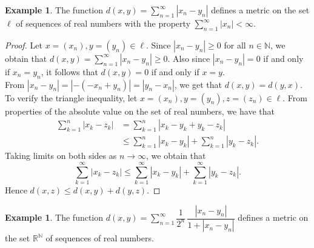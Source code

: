 \documentclass[11pt,a4paper]{article}
\theoremstyle{definition}
\newtheorem{exa}[thm]{Example}
\begin{document}
\begin{exa}
The function $d(x,y)=\sum_{n=1}^{\infty} |x_n-y_n|$ defines a metric on the set $\ell$ of sequences of real numbers with the property $\sum^{\infty}_{n=1} |x_n| <\infty$.
\end{exa}



\begin{proof}
Let $x=(x_n),y=(y_n)\in \ell$. Since $|x_n-y_n|\geq 0$ for all $n\in \mathbb{N}$, we obtain that $d(x,y)=\sum\limits^{\infty}_{n=1} |x_n-y_n|\geq 0$. Also since $|x_n-y_n|=0$ if and only if $x_n=y_n$, it follows that $d(x,y)=0$ if and only if $x=y$.\\ 
From $|x_n-y_n|=|-(-x_n+y_n)|=|y_n-x_n|$, we get that $d(x,y)=d(y,x).$\\ 
To verify the triangle inequality, let $x=(x_n), y=(y_n), z=(z_n)\in \ell$. From properties of the absolute value on the set of real numbers, we have that
\begin{align*}
\sum^n_{k=1} |x_k-z_k| &=\sum_{k=1}^n |x_k-y_k+y_k-z_k|\\
                       &\leq \sum^n_{k=1} |x_k-y_k| +\sum^n_{k=1} |y_k-z_k|.
\end{align*} 
Taking limits on both sides as $n\rightarrow \infty$, we obtain that $$\sum\limits^{\infty}_{k=1} |x_k-z_k|\leq \sum\limits_{k=1}^{\infty} |x_k-y_k|+\sum\limits^{\infty}_{k=1} |y_k-z_k|.$$ Hence $d(x,z)\leq d(x,y)+d(y,z)$.
\end{proof}






\begin{exa}
The function $d(x,y)=\sum\limits^{\infty}_{n=1} \dfrac{1}{2^n}\,\dfrac{|x_n-y_n|}{1+|x_n-y_n|}$ defines a metric on the set $\mathbb{R}^{\mathbb{N}}$ of sequences of real numbers.
\end{exa}
\end{document}
